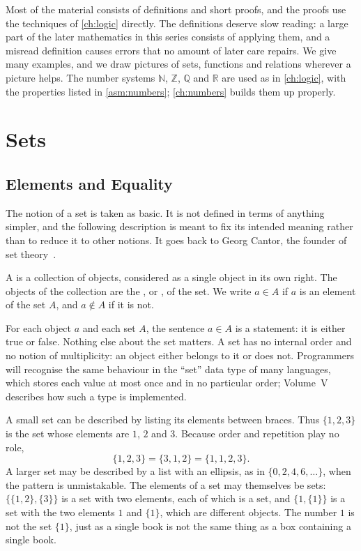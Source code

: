 Most of the material consists of definitions and short proofs, and the proofs use the techniques of \cref{ch:logic} directly. The definitions deserve slow reading: a large part of the later mathematics in this series consists of applying them, and a misread definition causes errors that no amount of later care repairs. We give many examples, and we draw pictures of sets, functions and relations wherever a picture helps. The number systems $\mathbb N$, $\mathbb Z$, $\mathbb Q$ and $\mathbb R$ are used as in \cref{ch:logic}, with the properties listed in \cref{asm:numbers}; \cref{ch:numbers} builds them up properly.

\section{Sets}
\label{sec:sets}

\subsection{Elements and Equality}

The notion of a set is taken as basic. It is not defined in terms of anything simpler, and the following description is meant to fix its intended meaning rather than to reduce it to other notions. It goes back to Georg Cantor, the founder of set theory~\cite{cantor1895}.

\begin{definition}
\label{def:set}
A  is a collection of objects, considered as a single object in its own right. The objects of the collection are the , or , of the set. We write $a\in A$ if $a$ is an element of the set $A$, and $a\notin A$ if it is not.
\end{definition}

For each object $a$ and each set $A$, the sentence $a\in A$ is a statement: it is either true or false. Nothing else about the set matters. A set has no internal order and no notion of multiplicity: an object either belongs to it or does not. Programmers will recognise the same behaviour in the ``set'' data type of many languages, which stores each value at most once and in no particular order; Volume~V describes how such a type is implemented.

A small set can be described by listing its elements between braces. Thus $\{1,2,3\}$ is the set whose elements are $1$, $2$ and $3$. Because order and repetition play no role,
\[
\{1,2,3\}=\{3,1,2\}=\{1,1,2,3\}.
\]
A larger set may be described by a list with an ellipsis, as in $\{0,2,4,6,\ldots\}$, when the pattern is unmistakable. The elements of a set may themselves be sets: $\{\{1,2\},\{3\}\}$ is a set with two elements, each of which is a set, and $\{1,\{1\}\}$ is a set with the two elements $1$ and $\{1\}$, which are different objects. The number $1$ is not the set $\{1\}$, just as a single book is not the same thing as a box containing a single book.

